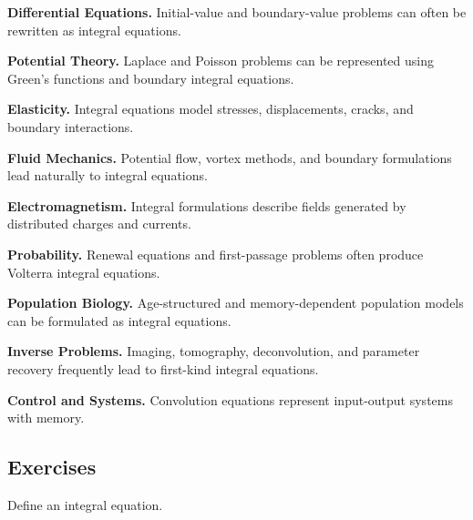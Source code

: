 \begin{applicationbox}

\textbf{Differential Equations.}
Initial-value and boundary-value problems can often be rewritten as
integral equations.

\medskip

\textbf{Potential Theory.}
Laplace and Poisson problems can be represented using Green's functions
and boundary integral equations.

\medskip

\textbf{Elasticity.}
Integral equations model stresses, displacements, cracks, and boundary
interactions.

\medskip

\textbf{Fluid Mechanics.}
Potential flow, vortex methods, and boundary formulations lead naturally
to integral equations.

\medskip

\textbf{Electromagnetism.}
Integral formulations describe fields generated by distributed charges
and currents.

\medskip

\textbf{Probability.}
Renewal equations and first-passage problems often produce Volterra
integral equations.

\medskip

\textbf{Population Biology.}
Age-structured and memory-dependent population models can be formulated
as integral equations.

\medskip

\textbf{Inverse Problems.}
Imaging, tomography, deconvolution, and parameter recovery frequently
lead to first-kind integral equations.

\medskip

\textbf{Control and Systems.}
Convolution equations represent input-output systems with memory.

\end{applicationbox}

\subsection{Exercises}
\label{subsec:integral-equation-exercises}

\begin{exercise}[1]
Define an integral equation.
\end{exercise}

